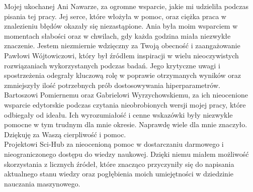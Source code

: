 \documentclass[a4paper,twoside,12pt]{book}
\begin{document}
Mojej ukochanej Ani Nawarze, za ogromne wsparcie, jakie mi udzieliła podczas pisania tej pracy. Jej serce, które włożyła w pomoc, oraz ciężka praca w znalezieniu błędów okazały się niezastąpione. Ania była moim wsparciem w momentach słabości oraz w chwilach, gdy każda godzina miała niezwykłe znaczenie. Jestem niezmiernie wdzięczny za Twoją obecność i zaangażowanie\\

Pawłowi Wójtowiczowi, który był źródłem inspiracji w wielu nieoczywistych rozwiązaniach wykorzystanych podczas badań. Jego krytyczne uwagi i spostrzeżenia odegrały kluczową rolę w poprawie otrzymanych wyników oraz zmniejszyły ilość potrzebnych prób dostosowywania hiperparametrów.\\

Bartoszowi Pomiernemu oraz Gabrielowi Wyrzychowskiemu, za ich nieocenione wsparcie edytorskie podczas czytania nieobrobionych wersji mojej pracy, które odbiegały od ideału. Ich wyrozumiałość i cenne wskazówki były niezwykle pomocne w tym trudnym dla mnie okresie. Naprawdę wiele dla mnie znaczyło. Dziękuję za Waszą cierpliwość i pomoc.\\

Projektowi Sci-Hub za nieocenioną pomoc w dostarczaniu darmowego i nieograniczonego dostępu do wiedzy naukowej. Dzięki niemu miałem możliwość skorzystania z licznych źródeł, które znacząco przyczyniły się do napisania aktualnego stanu wiedzy oraz pogłębienia moich umiejętności w dziedzinie nauczania maszynowego.





\end{document}
